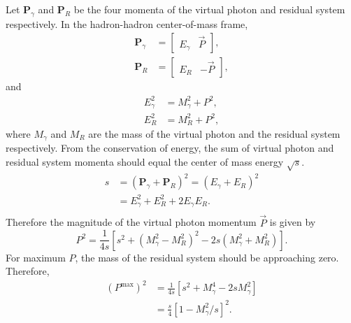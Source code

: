 \documentclass[../main.tex]{subfiles}
\begin{document}
Let $\mathbf{P}_\gamma$ and $\mathbf{P}_R$ be the four momenta of the virtual photon and residual system respectively.
In the hadron-hadron center-of-mass frame,
\begin{equation}
	\begin{split}
		\mathbf{P}_\gamma & = \begin{bmatrix}
			                      E_\gamma & \vec{P}
		                      \end{bmatrix}, \\
		\mathbf{P}_R      & = \begin{bmatrix}
			                      E_R & -\vec{P}
		                      \end{bmatrix},
	\end{split}
\end{equation}
and
\begin{equation}
	\begin{split}
		E^2_\gamma & = M_\gamma^2 + P^2, \\
		E^2_R      & = M_R^2 + P^2,
	\end{split}
\end{equation}
where $M_\gamma$ and $M_R$ are the mass of the virtual photon and the residual system respectively.
From the conservation of energy, the sum of virtual photon and residual system momenta should
equal the center of mass energy $\sqrt{s}$.
\begin{equation}
	\begin{split}
		s & =\left( \mathbf{P}_\gamma+\mathbf{P}_R \right)^2 = \left(E_\gamma+E_R\right)^2 \\
		  & = E_\gamma^2+E_R^2+2E_\gamma E_R.                                              \\
	\end{split}
\end{equation}
Therefore the magnitude of the virtual photon momentum $\vec{P}$ is given by
\begin{equation}
	P^2 = \frac{1}{4s} \left[ s^2 + \left(M_\gamma^2 - M_R^2\right)^2 -2s\left(M^2_\gamma+M_R^2\right) \right].
\end{equation}
For maximum $P$, the mass of the residual system should be approaching zero. Therefore,
\begin{equation}
	\begin{split}
		\left(P^{\mathrm{max}}\right)^2 & = \frac{1}{4s} \left[ s^2 +  M_\gamma^4 -2sM_\gamma^2\right] \\
		                                & =\frac{s}{4}\left[ 1 -M_\gamma^2/s\right]^2.                 \\
	\end{split}
\end{equation}
\end{document}
